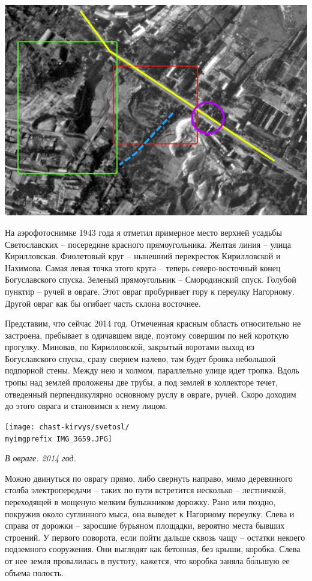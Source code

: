\begin{center}
\includegraphics[width=\linewidth]{chast-kirvys/svetosl/sveto-aero.jpg}
\end{center}

На аэрофотоснимке 1943 года я отметил примерное место верхней усадьбы Светославских – посередине красного прямоугольника. Желтая линия – улица Кирилловс\-кая. Фиолетовый круг – нынешний перекресток Кирилловской и Нахимова. Самая левая точка этого круга – теперь северо-восточный конец Богуславского спуска. Зеленый прямоугольник – Смородинский спуск. Голубой пунктир – ручей в овраге. Этот овраг пробуривает гору к переулку Нагорному. Другой овраг как бы огибает часть склона восточнее.

Представим, что сейчас 2014 год. Отмеченная красным область относительно не застроена, пребывает в одичавшем виде, поэтому совершим по ней короткую прогулку. Миновав, по Кирилловской, закрытый воротами выход из Богуславского спуска, сразу свернем налево, там будет бровка небольшой подпорной стены. Между нею и холмом, параллельно улице идет тропка. Вдоль тропы над землей проложены две трубы, а под землей в коллекторе течет, отведенный перпендикулярно основному руслу в овраге, ручей. Скоро доходим до этого оврага и становимся к нему лицом.

\begin{center}
\texttt{[image: chast-kirvys/svetosl/\\myimgprefix IMG\_3659.JPG]}

\textit{В овраге. 2014 год.}
\end{center}

Можно двинуться по оврагу прямо, либо свернуть направо, мимо деревянного столба электропередачи – таких по пути встретится несколько – лестничкой, переходящей в мощеную мелким булыжником дорожку. Рано или поздно, покружив около суглинного мыса, она выведет к Нагорному переулку. Слева и справа от дорожки – заросшие бурьяном площадки, вероятно места бывших строений. У первого поворота, если пойти дальше сквозь чащу – остатки некоего подземного сооружения. Они выглядят как бетонная, без крыши, коробка. Слева от нее земля провалилась в пустоту, кажется, что коробка заняла б\'ольшую ее объема полость. 

